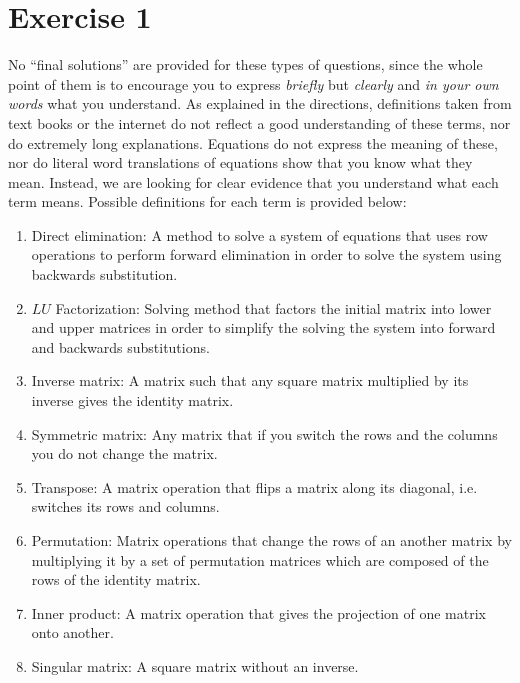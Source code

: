 \section{Exercise 1}
No ``final solutions'' are provided for these types of questions, since the
whole point of them is to encourage you to express \emph{briefly} but
\emph{clearly} and \emph{in your own words} what you understand. As
explained in the directions, definitions taken from text books or the
internet do not reflect a good understanding of these terms, nor do
extremely long explanations. Equations do not express the meaning of these,
nor do literal word translations of equations show that you know what they
mean. Instead, we are looking for clear evidence that you understand what
each term means. Possible definitions for each term is provided below: 
\begin{mdframed}[style=MyFrame]
\begin{enumerate}[label=(\alph*)]
    \item Direct elimination: A method to solve a system of equations that
        uses row operations to perform forward elimination  in order to
        solve the system using backwards substitution.

    \item $LU$ Factorization: Solving method that factors the initial
        matrix into lower and upper matrices in order to simplify the
        solving the system into forward and backwards substitutions.

    \item Inverse matrix: A matrix such that any square matrix multiplied
        by its inverse gives the identity matrix.
        
    \item Symmetric matrix: Any matrix that if you switch the rows and the
        columns you do not change the matrix.

    \item Transpose: A matrix operation that  flips a matrix along its
        diagonal, i.e. switches its rows and columns.
        
    \item Permutation: Matrix operations that change the rows of an another
        matrix by multiplying it by a set of permutation matrices which are
        composed of the rows of the identity matrix. 

    \item Inner product: A matrix operation that gives the projection of
        one matrix onto another.  

    \item Singular matrix: A square matrix without an inverse.
\end{enumerate}
\end{mdframed}
